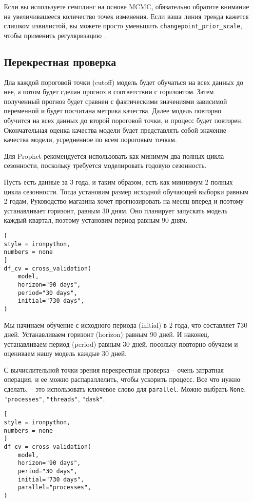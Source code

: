 \documentclass[%
	11pt,
	a4paper,
	utf8,
		]{article}
\begin{document}
Если вы используете семплинг на основе MCMC, обязательно обратите внимание на увеличивашееся количество точек изменения. Если ваша линия тренда кажется слишком извилистой, вы можете просто уменьшить \verb|changepoint_prior_scale|, чтобы применить регуляризацию \cite[]{gruzdev:time-series-2022}.

\subsection{Перекрестная проверка}

Дла каждой пороговой точки (cutoff) модель будет обучаться на всех данных до нее, а потом будет сделан прогноз в соответствии с горизонтом. Затем полученный прогноз будет сравнен с фактическими значениями зависимой переменной и будет посчитана метрика качества. Далее модель повторно обучится на всех данных до второй пороговой точки, и процесс будет повторен. Окончательная оценка качества модели будет представлять собой значение качества модели, усредненное по всем пороговым точкам.

Для Prophet рекомендуется использовать как минимум два полных цикла сезонности, поскольку требуется моделировать годовую сезонность.

Пусть есть данные за 3 года, и таким образом, есть как миинимум 2 полных цикла сезонности. Тогда установим размер исходной обучающей выборки равным 2 годам, Руководство магазина хочет прогнозировать на месяц вперед и поэтому устанавливает горизонт, равным 30 дням. Оно планирует запускать модель каждый квартал, поэтому установим период равным 90 дням.
\begin{lstlisting}[
style = ironpython,
numbers = none
]
df_cv = cross_validation(
    model,
    horizon="90 days",
    period="30 days",
    initial="730 days",
)
\end{lstlisting}

Мы начинаем обучение с исходного периода (initial) в 2 года, что составляет 730 дней. Устанавливаем горизонт (horizon) равным 90 дней. И наконец, устанавливаем период (period) равным 30 дней, посольку повторно обучаем и оцениваем нашу модель каждые 30 дней.

С вычислительной точки зрения перекрестная проверка -- очень затратная операция, и ее можно распараллелить, чтобы ускорить процесс. Все что нужно сделать, -- это использовать ключевое слово для \verb|parallel|. Можно выбрать \verb|None|, \verb|"processes"|, \verb|"threads"|, \verb|"dask"|.
\begin{lstlisting}[
style = ironpython,
numbers = none
]
df_cv = cross_validation(
    model,
    horizon="90 days",
    period="30 days",
    initial="730 days",
    parallel="processes",
)
\end{lstlisting}
\end{document}
